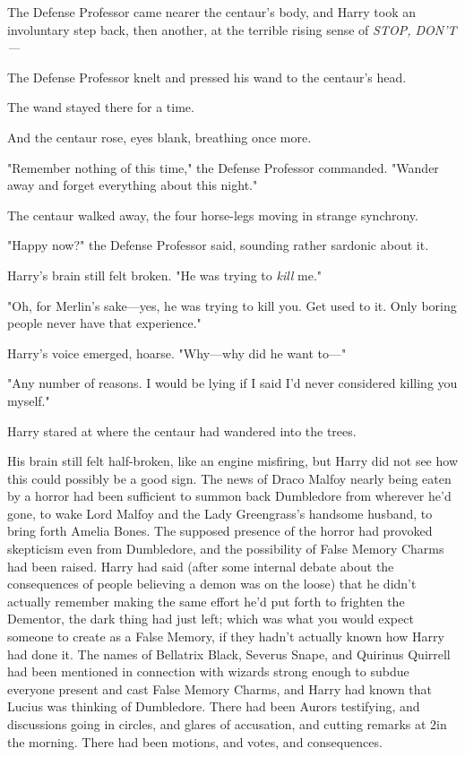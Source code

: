 The Defense Professor came nearer the centaur's body, and Harry took an
involuntary step back, then another, at the terrible rising sense of
\emph{STOP, DON'T—}

The Defense Professor knelt and pressed his wand to the centaur's head.

The wand stayed there for a time.

And the centaur rose, eyes blank, breathing once more.

"Remember nothing of this time," the Defense Professor commanded. "Wander away
and forget everything about this night."

The centaur walked away, the four horse-legs moving in strange synchrony.

"Happy now?" the Defense Professor said, sounding rather sardonic about it.

Harry's brain still felt broken. "He was trying to \emph{kill} me."

"Oh, for Merlin's sake—yes, he was trying to kill you. Get used to it. Only
boring people never have that experience."

Harry's voice emerged, hoarse. "Why—why did he want to—"

"Any number of reasons. I would be lying if I said I'd never considered killing
you myself."

Harry stared at where the centaur had wandered into the trees.

His brain still felt half-broken, like an engine misfiring, but Harry did not
see how this could possibly be a good sign.
\sbreak
The news of Draco Malfoy nearly being eaten by a horror had been sufficient to
summon back Dumbledore from wherever he'd gone, to wake Lord Malfoy and the
Lady Greengrass's handsome husband, to bring forth Amelia Bones. The supposed
presence of the horror had provoked skepticism even from Dumbledore, and the
possibility of False Memory Charms had been raised. Harry had said (after some
internal debate about the consequences of people believing a demon was on the
loose) that he didn't actually remember making the same effort he'd put forth
to frighten the Dementor, the dark thing had just left; which was what you
would expect someone to create as a False Memory, if they hadn't actually known
how Harry had done it. The names of Bellatrix Black, Severus Snape, and
Quirinus Quirrell had been mentioned in connection with wizards strong enough
to subdue everyone present and cast False Memory Charms, and Harry had known
that Lucius was thinking of Dumbledore. There had been Aurors testifying, and
discussions going in circles, and glares of accusation, and cutting remarks at
2\AM in the morning. There had been motions, and votes, and consequences.

